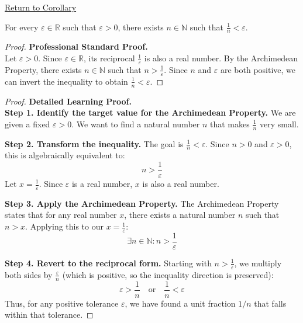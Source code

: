 \newpage
{}
\label{prf:archimedean-reciprocal}

\begin{remark*}[Return]
\hyperref[cor:archimedean-reciprocal]{Return to Corollary}
\end{remark*}

\begin{theorem*}
For every $\varepsilon \in \mathbb{R}$ such that $\varepsilon > 0$, there exists $n \in \mathbb{N}$ such that $\frac{1}{n} < \varepsilon$.
\end{theorem*}

\begin{proof}
\textbf{Professional Standard Proof.}~\\
Let $\varepsilon > 0$. Since $\varepsilon \in \mathbb{R}$, its reciprocal $\frac{1}{\varepsilon}$ is also a real number. By the Archimedean Property, there exists $n \in \mathbb{N}$ such that $n > \frac{1}{\varepsilon}$. Since $n$ and $\varepsilon$ are both positive, we can invert the inequality to obtain $\frac{1}{n} < \varepsilon$.
\end{proof}

\begin{proof}
\textbf{Detailed Learning Proof.}~\\

\textbf{Step 1. Identify the target value for the Archimedean Property.}
We are given a fixed $\varepsilon > 0$. We want to find a natural number $n$ that makes $\frac{1}{n}$ very small. 

\textbf{Step 2. Transform the inequality.}
The goal is $\frac{1}{n} < \varepsilon$. Since $n > 0$ and $\varepsilon > 0$, this is algebraically equivalent to:
\[ n > \frac{1}{\varepsilon} \]
Let $x = \frac{1}{\varepsilon}$. Since $\varepsilon$ is a real number, $x$ is also a real number.

\textbf{Step 3. Apply the Archimedean Property.}
The Archimedean Property states that for any real number $x$, there exists a natural number $n$ such that $n > x$. Applying this to our $x = \frac{1}{\varepsilon}$:
\[ \exists n \in \mathbb{N} : n > \frac{1}{\varepsilon} \]

\textbf{Step 4. Revert to the reciprocal form.}
Starting with $n > \frac{1}{\varepsilon}$, we multiply both sides by $\frac{\varepsilon}{n}$ (which is positive, so the inequality direction is preserved):
\[ \varepsilon > \frac{1}{n} \quad \text{or} \quad \frac{1}{n} < \varepsilon \]
Thus, for any positive tolerance $\varepsilon$, we have found a unit fraction $1/n$ that falls within that tolerance.
\end{proof}

